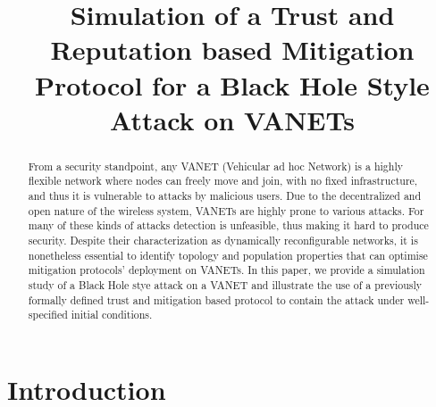 \documentclass[compsoc, conference, letterpaper, 10pt, times]{IEEEtran}
\begin{document}
\title{Simulation of a Trust and Reputation based Mitigation Protocol for a Black Hole Style Attack on VANETs}


\author{

\and

\and
{}
    }


\maketitle

\begin{abstract}
From a security standpoint, any VANET (Vehicular ad hoc Network) is a highly flexible network where nodes can freely move and join, with no fixed infrastructure, and thus it is vulnerable to attacks by malicious users. Due to the decentralized and open nature of the wireless system, VANETs are highly prone to various attacks. For many of these kinds of attacks detection is unfeasible, thus making it hard to produce security. Despite their characterization as dynamically reconfigurable networks, it is nonetheless essential to identify topology and population properties that can optimise mitigation protocols' deployment on VANETs. In this paper, we provide a simulation study of a Black Hole stye attack on a VANET and illustrate the use of a previously formally defined trust and mitigation based protocol to contain the attack under well-specified initial conditions.
\end{abstract}


\section{Introduction}\label{sec:intro}
\end{document}

